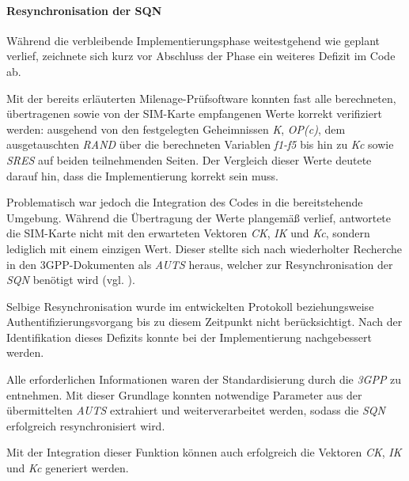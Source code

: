 		\paragraph{Resynchronisation der SQN} Während die verbleibende
		Implementierungsphase weitestgehend wie geplant verlief, zeichnete
		sich kurz vor Abschluss der Phase ein weiteres Defizit im Code ab.

		Mit der bereits erläuterten Milenage-Prüfsoftware konnten fast
		alle berechneten, übertragenen sowie von der SIM-Karte empfangenen
		Werte korrekt verifiziert werden: ausgehend von den festgelegten
		Geheimnissen \textit{K}, \textit{OP(c)}, dem ausgetauschten \textit{RAND}
		über die berechneten Variablen \textit{f1-f5} bis hin zu \textit{Kc} sowie
		\textit{SRES} auf beiden teilnehmenden Seiten.
		Der Vergleich dieser Werte deutete darauf hin, dass die Implementierung
		korrekt sein muss.

		Problematisch war jedoch die Integration des Codes in die bereitstehende
		Umgebung. Während die Übertragung der Werte plangemäß verlief, antwortete
		die SIM-Karte nicht mit den erwarteten Vektoren \textit{CK}, \textit{IK}
		und \textit{Kc}, sondern lediglich mit einem einzigen Wert. Dieser
		stellte sich nach wiederholter Recherche in den 3GPP-Dokumenten als
		\textit{AUTS} heraus, welcher zur Resynchronisation der \textit{SQN}
		benötigt wird (vgl. ).

		Selbige Resynchronisation wurde im entwickelten
		Protokoll beziehungsweise Authentifizierungsvorgang bis zu diesem Zeitpunkt
		nicht berücksichtigt. Nach der Identifikation dieses Defizits
		konnte bei der Implementierung nachgebessert werden.

		Alle erforderlichen Informationen waren der Standardisierung
		durch die \textit{3GPP} zu entnehmen. Mit dieser Grundlage konnten
		notwendige Parameter aus der übermittelten \textit{AUTS} extrahiert
		und weiterverarbeitet werden, sodass die \textit{SQN} erfolgreich
		resynchronisiert wird. 

		Mit der Integration dieser Funktion können auch erfolgreich die
		Vektoren \textit{CK}, \textit{IK} und \textit{Kc} generiert werden.

\clearpage
